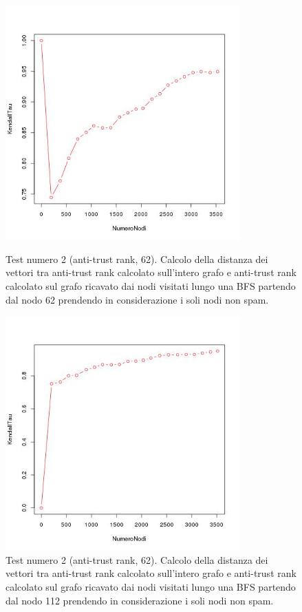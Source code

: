 \begin{figure}
\centering
 \includegraphics[height=9cm]{immagini/test2/antiTrustraktGoodNodesTestMode1_62}
 \caption{Test numero 2 (anti-trust rank, 62). Calcolo della distanza dei vettori tra anti-trust rank calcolato sull'intero grafo e anti-trust rank calcolato sul grafo ricavato dai nodi visitati lungo una BFS partendo dal nodo 62 prendendo in considerazione i soli nodi non spam. }
 \label{fig:test2antitrustModoB62}
\centering
 \includegraphics[height=9cm]{immagini/test2/antiTrustraktGoodNodesTestMode1_112}
 \caption{Test numero 2 (anti-trust rank, 62). Calcolo della distanza dei vettori tra anti-trust rank calcolato sull'intero grafo e anti-trust rank calcolato sul grafo ricavato dai nodi visitati lungo una BFS partendo dal nodo 112 prendendo in considerazione i soli nodi non spam. }
 \label{fig:test2antitrustModoB112}
\end{figure}

